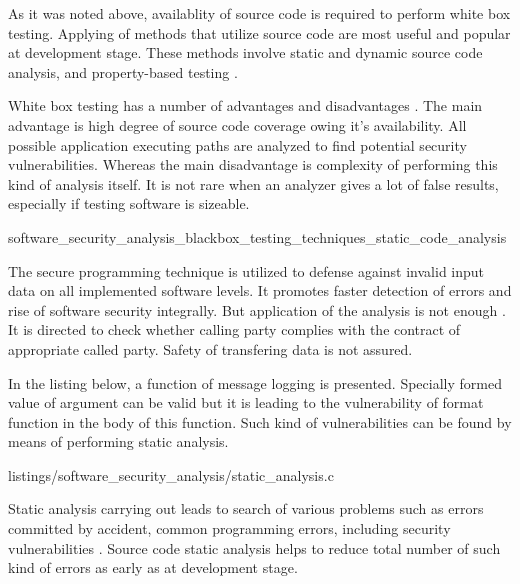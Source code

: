 %
As it was noted above, availablity of source code is required to perform white box testing. 
%
Applying of methods that utilize source code are most useful and popular at development stage. 
%
These methods involve static and dynamic source code analysis, and property-based testing . 

%
White box testing has a number of advantages and disadvantages . 
%
The main advantage is \A high degree of source code coverage owing it's availability. 
%
All possible application executing paths are analyzed to find potential security vulnerabilities. 
%
Whereas the main disadvantage is complexity of performing this kind of analysis itself. 
%
It is not rare when an analyzer gives a lot of false results, especially if testing software is sizeable. 


	{software_security_analysis_blackbox_testing_techniques_static_code_analysis}

%
The secure programming technique  is utilized to defense against invalid input data on all implemented software levels. 
%
It promotes faster detection of errors and rise of software security integrally. 
%
But application of the analysis is not enough . 
%
It is directed to check whether calling party complies with the contract of appropriate called party. 
%
Safety of transfering data is not assured. 

%
In the listing below, a function of message logging is presented. 
%
Specially formed value of  argument can be valid but it is leading to the vulnerability of  format function in the body of this function. 
%
Such kind of vulnerabilities can be found by means of performing static analysis. 

	{listings/software_security_analysis/static_analysis.c}

%
Static analysis carrying out leads to search of various problems such as errors committed by accident, common programming errors, including security vulnerabilities . 
%
Source code static analysis helps to reduce \A total number of such kind of errors as early as at development stage. 

